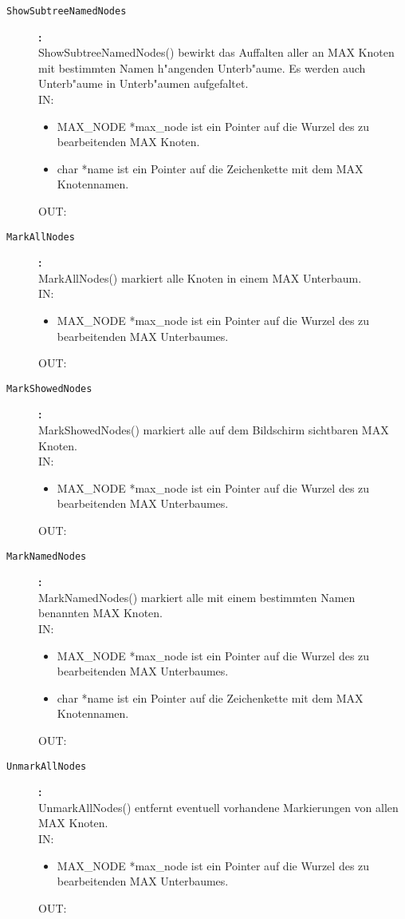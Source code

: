 \begin{description}
\item[\tt ShowSubtreeNamedNodes]{\bf :\\}
ShowSubtreeNamedNodes() bewirkt das Auffalten aller an MAX Knoten mit bestimmten Namen h"angenden Unterb"aume. Es werden auch Unterb"aume in Unterb"aumen aufgefaltet. \\
IN:
\begin{itemize}
   \item MAX\_NODE *max\_node ist ein Pointer auf die Wurzel des zu bearbeitenden MAX Knoten.
   \item char *name ist ein Pointer auf die Zeichenkette mit dem MAX Knotennamen.
\end{itemize}
OUT:

\item[\tt MarkAllNodes]{\bf :\\}
MarkAllNodes() markiert alle Knoten in einem MAX Unterbaum. \\
IN:
\begin{itemize}
   \item MAX\_NODE *max\_node ist ein Pointer auf die Wurzel des zu bearbeitenden MAX Unterbaumes.
\end{itemize}
OUT:

\item[\tt MarkShowedNodes]{\bf :\\}
MarkShowedNodes() markiert alle auf dem Bildschirm sichtbaren MAX Knoten. \\
IN:
\begin{itemize}
   \item MAX\_NODE *max\_node ist ein Pointer auf die Wurzel des zu bearbeitenden MAX Unterbaumes.
\end{itemize}
OUT:

\item[\tt MarkNamedNodes]{\bf :\\}
MarkNamedNodes() markiert alle mit einem bestimmten Namen benannten MAX Knoten. \\
IN:
\begin{itemize}
   \item MAX\_NODE *max\_node ist ein Pointer auf die Wurzel des zu bearbeitenden MAX Unterbaumes.
   \item char *name ist ein Pointer auf die Zeichenkette mit dem MAX Knotennamen.
\end{itemize}
OUT:

\item[\tt UnmarkAllNodes]{\bf :\\}
UnmarkAllNodes() entfernt eventuell vorhandene Markierungen von allen MAX Knoten. \\
IN:
\begin{itemize}
   \item MAX\_NODE *max\_node ist ein Pointer auf die Wurzel des zu bearbeitenden MAX Unterbaumes.
\end{itemize}
OUT:


\end{description}
